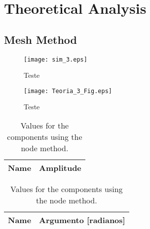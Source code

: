 \section{Theoretical Analysis}
\label{sec:analysis}

\subsection{Mesh Method}
\label{subsec:mesh}

\begin{figure}[!ht] 
\caption{Teste}
\texttt{[image: sim\_3.eps]}
\end{figure}


\begin{figure}[!ht]
\caption{Teste}
\texttt{[image: Teoria\_3\_Fig.eps]}
\end{figure}




\begin{table}[h]
  \centering
  \begin{tabular}{|l|r|}
    \hline    
    {\bf Name} & {\bf Amplitude} \\ \hline
    
  \end{tabular}
  \caption{Values for the components using the node method.}
  \label{tab4_Amp}
\end{table}


\begin{table}[h]
  \centering
  \begin{tabular}{|l|r|}
    \hline    
    {\bf Name} & {\bf Argumento [radianos]} \\ \hline
    
  \end{tabular}
  \caption{Values for the components using the node method.}
  \label{tab4_Arg}
\end{table}

